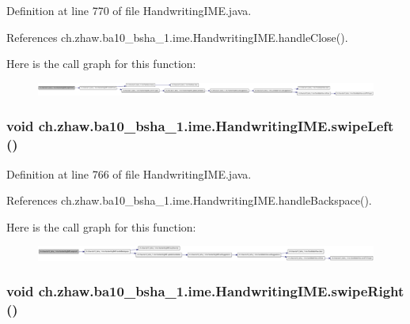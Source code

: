 Definition at line 770 of file HandwritingIME.java.

References ch.zhaw.ba10\_\-bsha\_\-1.ime.HandwritingIME.handleClose().

Here is the call graph for this function:\nopagebreak
\begin{figure}[H]
\begin{center}
\leavevmode
\includegraphics[width=420pt]{classch_1_1zhaw_1_1ba10__bsha__1_1_1ime_1_1HandwritingIME_aa35f0cbc95d0b5623c29229e3a8ee2e5_cgraph}
\end{center}
\end{figure}
\hypertarget{classch_1_1zhaw_1_1ba10__bsha__1_1_1ime_1_1HandwritingIME_aab0d09eae40077fbdb87a21566a266ea}{
\subsubsection[{swipeLeft}]{\setlength{\rightskip}{0pt plus 5cm}void ch.zhaw.ba10\_\-bsha\_\-1.ime.HandwritingIME.swipeLeft ()}}
\label{classch_1_1zhaw_1_1ba10__bsha__1_1_1ime_1_1HandwritingIME_aab0d09eae40077fbdb87a21566a266ea}


Definition at line 766 of file HandwritingIME.java.

References ch.zhaw.ba10\_\-bsha\_\-1.ime.HandwritingIME.handleBackspace().

Here is the call graph for this function:\nopagebreak
\begin{figure}[H]
\begin{center}
\leavevmode
\includegraphics[width=420pt]{classch_1_1zhaw_1_1ba10__bsha__1_1_1ime_1_1HandwritingIME_aab0d09eae40077fbdb87a21566a266ea_cgraph}
\end{center}
\end{figure}
\hypertarget{classch_1_1zhaw_1_1ba10__bsha__1_1_1ime_1_1HandwritingIME_a5a27dd14331c21af3031ffcd38d802f4}{
\subsubsection[{swipeRight}]{\setlength{\rightskip}{0pt plus 5cm}void ch.zhaw.ba10\_\-bsha\_\-1.ime.HandwritingIME.swipeRight ()}}
\label{classch_1_1zhaw_1_1ba10__bsha__1_1_1ime_1_1HandwritingIME_a5a27dd14331c21af3031ffcd38d802f4}


